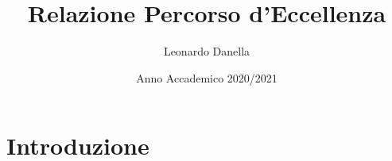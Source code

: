 \documentclass[it]{article}
\title{Relazione Percorso d'Eccellenza}
\author{Leonardo Danella}
\date{Anno Accademico 2020/2021}
\begin{document}
\maketitle{}


\section{Introduzione}
    
    	
    	
    	
    	
    	
    	
	
\end{document}
